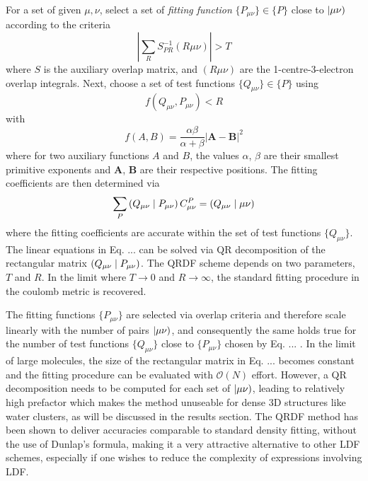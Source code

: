 For a set of given $\mu,\nu$, select a set of \emph{fitting function} $\{P_{\mu\nu}\} \in \{P\}$ close to $\left\lvert \mu\nu \right)$ according to the criteria
\begin{equation}
\left\lvert \sum_R S_{PR}^{-1} (R\mu\nu) \right\rvert > T 
\end{equation} 
\noindent where $S$ is the auxiliary overlap matrix, and $(R\mu\nu)$ are the 1-centre-3-electron overlap integrals. Next, choose a set of test functions $\{Q_{\mu\nu}\} \in \{P\}$ using
\begin{equation}
f(Q_{\mu\nu},P_{\mu\nu}) < R
\label{eq:QRDF_TEST}
\end{equation}
\noindent with
\begin{equation}
f(A,B) = \frac{\alpha \beta}{\alpha + \beta} \left\lvert \mathbf{A} - \mathbf{B} \right\rvert^2
\end{equation}
\noindent where for two auxiliary functions $A$ and $B$, the values $\alpha$, $\beta$ are their smallest primitive exponents and $\mathbf{A}$, $\mathbf{B}$ are their respective positions. The fitting coefficients are then determined via
\begin{equation}
\sum_P \left( Q_{\mu\nu} \mid P_{\mu\nu} \right) C^P_{\mu\nu} = \left( Q_{\mu\nu} \mid \mu\nu \right)
\end{equation}
\noindent where the fitting coefficients are accurate within the set of test functions $\{Q_{\mu\nu}\}$. The linear equations in Eq. ... can be solved via QR decomposition of the rectangular matrix $\left( Q_{\mu\nu} \mid P_{\mu\nu} \right)$.
The QRDF scheme depends on two parameters, $T$ and $R$. In the limit where $T \rightarrow 0$ and $R \rightarrow \infty$, the standard fitting procedure in the coulomb metric is recovered. 

The fitting functions $\{P_{\mu\nu}\}$ are selected via overlap criteria and therefore scale linearly with the number of pairs $\left\lvert \mu\nu \right)$, and consequently the same holds true for the number of test functions $\{Q_{\mu\nu}\}$ close to $\{P_{\mu\nu}\}$ chosen by Eq. ... . In the limit of large molecules, the size of the rectangular matrix in Eq. ... becomes constant and the fitting procedure can be evaluated with $\mathcal{O}(N)$ effort. However, a QR decomposition needs to be computed for each set of $\left\lvert \mu\nu \right)$, leading to relatively high prefactor which makes the method unuseable for dense 3D structures like water clusters, as will be discussed in the results section.
The QRDF method has been shown to deliver accuracies comparable to standard density fitting, without the use of Dunlap's formula, making it a very attractive alternative to other LDF schemes, especially if one wishes to reduce the complexity of expressions involving LDF.


